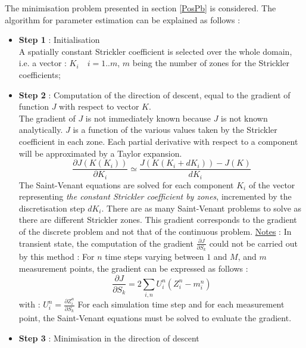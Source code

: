 \vspace{0.5cm}

The minimisation problem presented in section \ref{PosPb} is considered. The algorithm for parameter estimation can be explained as follows :

\begin{itemize}
  \item \textbf{Step 1} : Initialisation \\
   A spatially constant Strickler coefficient is selected over the whole domain, i.e. a vector : $K_i \quad i=1..m$, $m$ being the number of zones for the Strickler coefficients;
  \item \textbf{Step 2} : Computation of the direction of descent, equal to the gradient of function $J$ with respect to vector $K$. \\
    The gradient of $J$ is not immediately known because $J$ is not known analytically.
    $J$ is a function of the various values taken by the Strickler coefficient in each zone. Each partial derivative with respect to a component will be approximated by a Taylor expansion.
    \begin{equation}
      \frac{\partial J(K(K_i))}{\partial K_i} \simeq \frac{J(K(K_i+dK_i))-J(K)}{dK_i}
    \end{equation}
    The Saint-Venant equations are solved for each component $K_i$ of the vector representing \textit{the constant Strickler coefficient by zones}, incremented by the discretisation step $dK_i$. There are as many Saint-Venant problems to solve as there are different Strickler zones.
    This gradient corresponds to the gradient of the discrete problem and not that of the continuous problem.
    \underline{Notes} : In transient state, the computation of the gradient $\frac{\partial J}{\partial S_k}$ could not be carried out by this method :
    \vspace{0.5cm}
    For $n$ time steps varying between $1$ and $M$, and $m$ measurement points, the gradient can be expressed as follows :
    \begin{equation}
      \frac{\partial J}{\partial S_k} = 2 \sum_{i,n} U_{i}^n (Z_{i}^n - m_{i}^n)
    \end{equation}
    with : $U_{i}^n = \frac{\partial Z_{i}^n}{\partial S_k}$
    \vspace{0.5cm}
    For each simulation time step and for each measurement point, the Saint-Venant equations must be solved to evaluate the gradient.
  \item \textbf{Step 3} : Minimisation in the direction of descent \\

\end{itemize}
